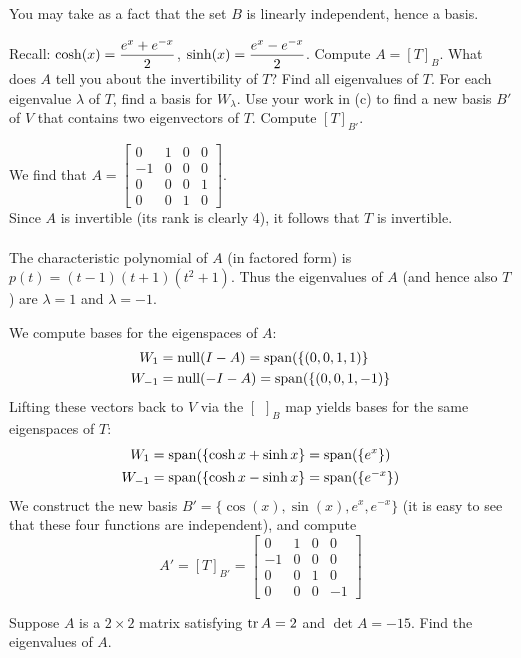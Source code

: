 You may take as a fact that the set $B$ is linearly independent, hence a basis. 

Recall: $\displaystyle\cosh(x)=\frac{e^x+e^{-x}}{2}$, $\displaystyle\sinh(x)=\frac{e^x-e^{-x}}{2}$. 
\bb
\ii Compute $A=[T]_B$. What does $A$ tell you about the invertibility of $T$?
\ii Find all eigenvalues of $T$.  
\ii For each eigenvalue $\lambda$ of $T$, find a basis for $W_\lambda$. 
\ii Use your work in (c) to find a new basis $B'$ of $V$ that contains two eigenvectors of $T$.
\ii  Compute $[T]_{B'}$. 
\ee
\begin{solution}
	We find that $A=\begin{bmatrix}
	0&1&0&0\\
	-1&0&0&0\\
	0&0&0&1\\
	0&0&1&0
	\end{bmatrix}$.
	\\
	Since $A$ is invertible (its rank is clearly 4), it follows that $T$ is invertible. 
	\\ \\
	The characteristic polynomial of $A$ (in factored form) is $p(t)=(t-1)(t+1)(t^2+1)$. Thus the eigenvalues of $A$ (and hence also $T$) are $\lambda=1$ and $\lambda=-1$. 
	
	We compute bases for the eigenspaces of $A$:
	\begin{align*}
	W_1&=\operatorname{null}(I-A)=\operatorname{span}(\{ (0,0,1,1)\}\\
	W_{-1}&=\operatorname{null}(-I-A)=\operatorname{span}(\{(0,0,1,-1)\}
	\end{align*}
	Lifting these vectors back to $V$ via the $[\hspace{5pt}]_B$ map yields bases for the same eigenspaces of $T$: \begin{align*}
	W_1&=\operatorname{span}(\{\cosh x+\sinh x\}=\operatorname{span}(\{e^x\})\\
	W_{-1}&=\operatorname{span}(\{\cosh x-\sinh x\}=\operatorname{span}(\{e^{-x}\})
	\end{align*}
	We construct the new basis $B'=\{\cos(x),\sin(x),e^x, e^{-x}\}$ (it is easy to see that these four functions are independent), and compute 
	\[
	A'=[T]_{B'}=\begin{bmatrix}
	0&1&0&0\\
	-1&0&0&0\\
	0&0&1&0\\
	0&0&0&-1
	\end{bmatrix}
	\]
\end{solution}
\ii Suppose $A$ is a $2\times 2$ matrix satisfying $\operatorname{tr} A=2$ and $\det A=-15$. Find the eigenvalues of $A$.
\\
